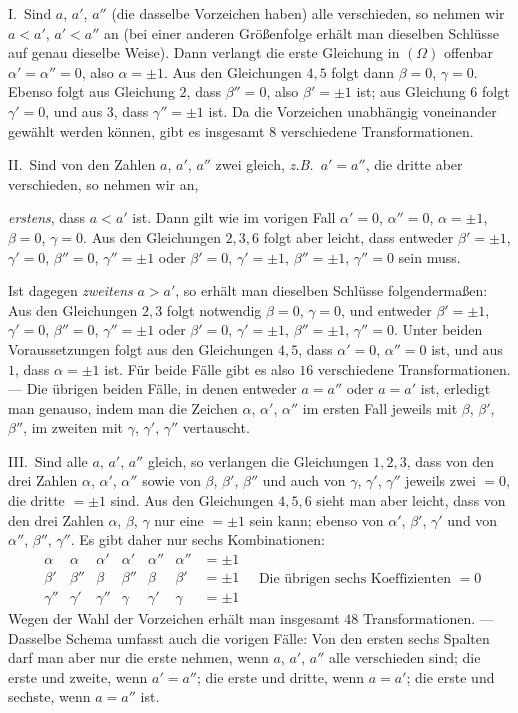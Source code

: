 I.\ Sind $a$, $a'$, $a''$ (die dasselbe Vorzeichen haben)
alle verschieden, so nehmen wir $a<a'$, $a'<a''$ an (bei einer anderen
Größenfolge erhält man dieselben Schlüsse auf genau dieselbe Weise).
Dann verlangt die erste Gleichung in $(\Omega)$ offenbar $\alpha'=\alpha''=0$, also
$\alpha=\pm1$. Aus den Gleichungen $4,5$ folgt dann $\beta=0$, $\gamma=0$.
Ebenso folgt aus Gleichung $2$, dass $\beta''=0$, also $\beta'=\pm1$ ist;
aus Gleichung $6$ folgt $\gamma'=0$, und aus $3$, dass $\gamma''=\pm1$
ist. Da die Vorzeichen unabhängig voneinander gewählt werden können,
gibt es insgesamt $8$ verschiedene Transformationen.

II.\ Sind von den Zahlen $a$, $a'$, $a''$ zwei gleich,
\textit{z.B.}\ $a'=a''$, die dritte aber verschieden, so nehmen wir an,

\textit{erstens}, dass $a<a'$ ist. Dann gilt wie im vorigen Fall
$\alpha'=0$, $\alpha''=0$, $\alpha=\pm1$, $\beta=0$, $\gamma=0$. Aus den Gleichungen $2,3,6$
folgt aber leicht, dass
entweder $\beta'=\pm1$, $\gamma'=0$, $\beta''=0$, $\gamma''=\pm1$ oder $\beta'=0$, $\gamma'=\pm1$,
$\beta''=\pm1$, $\gamma''=0$ sein muss.

Ist dagegen \textit{zweitens} $a>a'$, so erhält man dieselben Schlüsse
folgendermaßen: Aus den Gleichungen $2,3$ folgt notwendig $\beta=0$,
$\gamma=0$, und entweder $\beta'=\pm1$, $\gamma'=0$, $\beta''=0$, $\gamma''=\pm1$ oder $\beta'=0$,
$\gamma'=\pm1$, $\beta''=\pm1$, $\gamma''=0$. Unter beiden Voraussetzungen folgt aus
den Gleichungen $4,5$, dass $\alpha'=0$, $\alpha''=0$ ist, und aus $1$,
dass $\alpha=\pm1$ ist. Für beide Fälle gibt es also $16$ verschiedene
Transformationen. --- Die übrigen beiden Fälle, in denen entweder
$a=a''$ oder $a=a'$ ist, erledigt man genauso, indem man die Zeichen
$\alpha$, $\alpha'$, $\alpha''$ im ersten Fall jeweils mit $\beta$,
$\beta'$, $\beta''$, im zweiten mit $\gamma$, $\gamma'$, $\gamma''$ vertauscht.

III.\ Sind alle $a$, $a'$, $a''$ gleich, so verlangen die
Gleichungen $1,2,3$, dass von den drei Zahlen $\alpha$, $\alpha'$,
$\alpha''$ sowie von $\beta$, $\beta'$, $\beta''$ und auch von $\gamma$,
$\gamma'$, $\gamma''$ jeweils zwei $=0$, die dritte $=\pm1$ sind.
Aus den Gleichungen $4,5,6$ sieht man aber leicht, dass von den drei
Zahlen $\alpha$, $\beta$, $\gamma$ nur eine $=\pm1$ sein kann;
ebenso von $\alpha'$, $\beta'$, $\gamma'$ und von $\alpha''$, $\beta''$,
$\gamma''$. Es gibt daher nur sechs Kombinationen:
\[
\begin{array}{c|c|c|c|c|c|c|}
\alpha&\alpha&\alpha'&\alpha'&\alpha''&\alpha''&=\pm1\\
\beta'&\beta''&\beta&\beta''&\beta&\beta'&=\pm1\\
\gamma''&\gamma'&\gamma''&\gamma&\gamma'&\gamma&=\pm1
\end{array}
\quad\text{Die übrigen sechs Koeffizienten }=0
\]
Wegen der Wahl der Vorzeichen erhält man insgesamt $48$ Transformationen.
--- Dasselbe Schema umfasst auch die vorigen Fälle: Von den ersten
sechs Spalten darf man aber nur die erste nehmen, wenn $a$,
$a'$, $a''$ alle verschieden sind; die erste und zweite, wenn
$a'=a''$; die erste und dritte, wenn $a=a'$; die erste und sechste,
wenn $a=a''$ ist.

